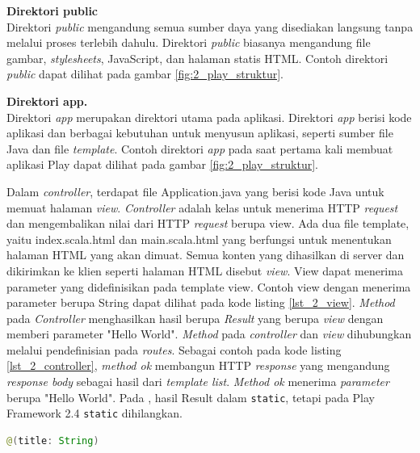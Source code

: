 \documentclass[a4paper,twoside]{article}
\begin{document}
\begin{enumerate}
\textbf{Direktori public}\\
Direktori \textit{public} mengandung semua sumber daya yang disediakan langsung tanpa melalui proses terlebih dahulu. Direktori \textit{public} biasanya mengandung file gambar, \textit{stylesheets}, JavaScript, dan halaman statis HTML. Contoh direktori \textit{public} dapat dilihat pada gambar \ref{fig:2_play_struktur}.
%

\textbf{Direktori app.}\\
Direktori \textit{app} merupakan direktori utama pada aplikasi. Direktori \textit{app} berisi kode aplikasi dan berbagai kebutuhan untuk menyusun aplikasi, seperti sumber file Java dan file \textit{template}. Contoh direktori \textit{app} pada saat pertama kali membuat aplikasi Play dapat dilihat pada gambar \ref{fig:2_play_struktur}. 

Dalam \textit{controller}, terdapat file Application.java yang berisi kode Java untuk memuat halaman \textit{view}. \textit{Controller} adalah kelas untuk menerima HTTP \textit{request} dan mengembalikan nilai dari HTTP \textit{request} berupa view. Ada dua file template, yaitu index.scala.html dan main.scala.html yang berfungsi untuk menentukan halaman HTML yang akan dimuat. Semua konten yang dihasilkan di server dan dikirimkan ke klien seperti halaman HTML disebut \textit{view}. View dapat menerima parameter yang didefinisikan pada template view. Contoh view dengan menerima parameter berupa String dapat dilihat pada kode listing \ref{lst_2_view}. \textit{Method} pada \textit{Controller} menghasilkan hasil berupa \textit{Result} yang berupa \textit{view} dengan memberi parameter "Hello World". \textit{Method} pada \textit{controller} dan \textit{view} dihubungkan melalui pendefinisian pada \textit{routes}. Sebagai contoh pada kode listing \ref{lst_2_controller}, \textit{method ok} membangun HTTP \textit{response} yang mengandung \textit{response body} sebagai hasil dari \textit{template list}. \textit{Method ok} menerima \textit{parameter} berupa "Hello World". Pada \cite{playforjava}, hasil Result dalam \verb!static!, tetapi pada Play Framework 2.4 \verb!static! dihilangkan.

\begin{lstlisting}[caption=Contoh View,label = {lst_2_view},language=Java]
@(title: String)


\end{lstlisting}
\end{enumerate}
\end{document}
